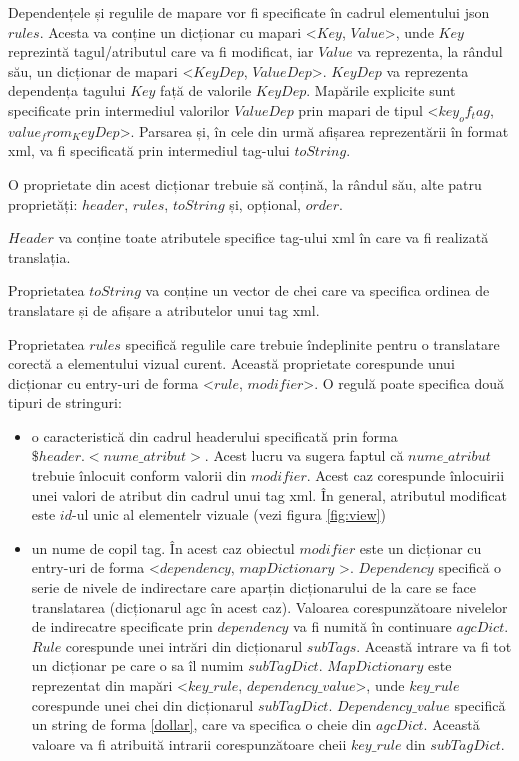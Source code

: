 Dependențele și regulile de mapare vor fi specificate în cadrul elementului json $rules$. Acesta va conține un dicționar cu mapari <$Key$, $Value$>, unde $Key$ reprezintă tagul/atributul care va fi modificat, iar $Value$ va reprezenta, la rândul său, un dicționar de mapari <$KeyDep$, $ValueDep$>.  $KeyDep$ va reprezenta dependența tagului $Key$ față de valorile $KeyDep$. Mapările explicite sunt specificate prin intermediul valorilor $ValueDep$ prin mapari de tipul <$key_of_tag$, $value_from_KeyDep$>. 
Parsarea și, în cele din urmă afișarea reprezentării în format xml, va fi specificată prin intermediul tag-ului $toString$. 

O proprietate din acest dicționar trebuie să conțină, la rândul său, alte patru proprietăți: $header$, $rules$, $toString$ și, opțional, $order$. 

$Header$ va conține toate atributele specifice tag-ului xml în care va fi realizată translația. 

Proprietatea $toString$ va conține un vector de chei care va specifica ordinea de translatare și de afișare a atributelor unui tag xml. 

Proprietatea $rules$ specifică regulile care trebuie îndeplinite pentru o translatare corectă a elementului vizual curent. Această proprietate corespunde unui dicționar cu entry-uri de forma <$rule$, $modifier$>.
O regulă poate specifica două tipuri de stringuri:

\begin{itemize}  
\item o caracteristică din cadrul headerului specificată prin forma $\$header.<nume\_atribut>$. Acest lucru va sugera faptul că $nume\_atribut$ trebuie înlocuit conform valorii  din $modifier$. Acest caz corespunde înlocuirii unei valori de atribut din cadrul unui tag xml. În general, atributul modificat este $id$-ul unic al elementelr vizuale (vezi figura \ref{fig:view})
\item un nume de copil tag. În acest caz obiectul $modifier$ este un dicționar cu entry-uri de forma <$dependency$, $mapDictionary$ >. $Dependency$ specifică o serie de nivele de indirectare care aparțin dicționarului de la care se face translatarea (dicționarul agc în acest caz). Valoarea corespunzătoare nivelelor de indirecatre specificate prin $dependency$ va fi numită în continuare $agcDict$. $Rule$ corespunde unei intrări din dicționarul $subTags$. Această intrare va fi tot un dicționar pe care o sa îl numim $subTagDict$. $MapDictionary$ este reprezentat din mapări <$key\_rule$, $dependency\_value$>, unde $key\_rule$ corespunde unei chei din dicționarul $subTagDict$. $Dependency\_value$ specifică un string de forma \ref{dollar}, care va specifica o cheie din $agcDict$. Această valoare va fi atribuită intrarii corespunzătoare cheii $key\_rule$ din $subTagDict$. 
\end{itemize}
 
